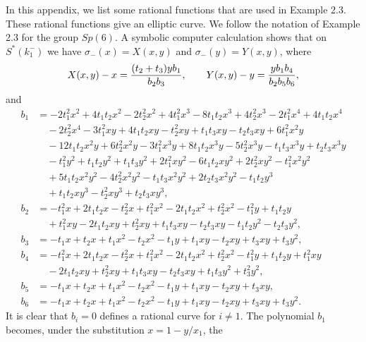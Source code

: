 \documentclass{amsart}
\begin{document}
In this appendix, we list some rational functions that are used
in Example 2.3.  These rational functions 
give an elliptic curve.
  We follow the notation of Example 2.3 for the group
$Sp(6)$.   A symbolic computer calculation shows that on $S^*(k^-_1)$
we have $\sigma_{-}(x) = X(x,y)$ and $\sigma_{-}(y) = Y(x,y)$,
where
$$X(x,y) - x = {(t_2 + t_3) y b_1\over b_2 b_3}, \qquad
  Y(x,y) - y = {y b_1 b_4\over b_2 b_5 b_6 },$$
and
\begin{align*}
b_1 &=  -2 t_1^2 x^2 + 4 t_1 t_2 x^2 - 2 t_2^2 x^2 + 4 t_1^2 x^3 - 8 t_1 t_2 x^3 + 
   4 t_2^2 x^3 - 2 t_1^2 x^4 + 4 t_1 t_2 x^4 \\
   &\quad
   - 2 t_2^2 x^4 - 3 t_1^2 x y + 
   4 t_1 t_2 x y - t_2^2 x y + t_1 t_3 x y - t_2 t_3 x y + 6 t_1^2 x^2 y \\
   &\quad
   - 12 t_1 t_2 x^2 y + 6 t_2^2 x^2 y - 3 t_1^2 x^3 y 
    + 8 t_1 t_2 x^3 y - 
   5 t_2^2 x^3 y - t_1 t_3 x^3 y + t_2 t_3 x^3 y \\
   &\quad - t_1^2 y^2 
    + t_1 t_2 y^2 + t_1 t_3 y^2 + 2 t_1^2 x y^2 
     - 6 t_1 t_2 x y^2 + 2 t_2^2 x y^2 - t_1^2 x^2 y^2 \\
   &\quad
   + 5 t_1 t_2 x^2 y^2 - 4 t_2^2 x^2 y^2 
    - t_1 t_3 x^2 y^2  + 2 t_2 t_3 x^2 y^2 - 
   t_1 t_2 y^3 \\
   &\quad
      + t_1 t_2 x y^3 - t_2^2 x y^3 + t_2 t_3 x y^3,\\
%
b_2 &=  -t_1^2 x + 2 t_1 t_2 x - t_2^2 x + t_1^2 x^2 - 2 t_1 t_2 x^2 + t_2^2 x^2 - 
   t_1^2 y + t_1 t_2 y \\
    &\quad + t_1^2 x y - 2 t_1 t_2 x y + t_2^2 x y + t_1 t_3 x y - 
   t_2 t_3 x y - t_1 t_2 y^2 - t_2 t_3 y^2,\\
%
b_3 &=  -t_1 x + t_2 x + 
       t_1 x^2 - t_2 x^2 - t_1 y + t_1 x y - t_2 x y + t_3 x y + t_3 y^2,\\
%
b_4 &=  -t_1^2 x + 2 t_1 t_2 x - t_2^2 x + t_1^2 x^2 - 2 t_1 t_2 x^2 + t_2^2 x^2 - 
   t_1^2 y + t_1 t_2 y + t_1^2 x y \\
   &\quad - 2 t_1 t_2 x y + t_2^2 x y + t_1 t_3 x y - 
   t_2 t_3 x y + t_1 t_3 y^2 + t_3^2 y^2,\\
%
b_5 &=  -t_1 x + t_2 x + t_1 x^2 - t_2 x^2 - t_1 y + t_1 x y - t_2 x y + t_3 x y,\\
%
b_6 &=  -t_1 x + t_2 x + t_1 x^2 - t_2 x^2 - t_1 y + 
             t_1 x y - t_2 x y + t_3 x y + t_3 y^2.
\end{align*}
It is clear that $b_i=0$ defines a rational curve for $i\ne 1$.  The
polynomial $b_1$ becomes, under the substitution $x = 1- y/x_1$, the
\end{document}
